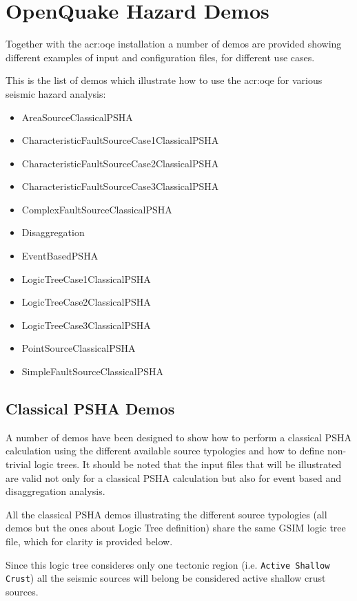 \section{OpenQuake Hazard Demos}
Together with the \gls{acr:oqe} installation a number of demos are provided 
showing different examples of input and configuration files, for different 
use cases.

This is the list of demos which illustrate how to use the \gls{acr:oqe} for 
various seismic hazard analysis:
\begin{itemize}
\item AreaSourceClassicalPSHA
\item CharacteristicFaultSourceCase1ClassicalPSHA
\item CharacteristicFaultSourceCase2ClassicalPSHA
\item CharacteristicFaultSourceCase3ClassicalPSHA
\item ComplexFaultSourceClassicalPSHA
\item Disaggregation
\item EventBasedPSHA
\item LogicTreeCase1ClassicalPSHA
\item LogicTreeCase2ClassicalPSHA
\item LogicTreeCase3ClassicalPSHA
\item PointSourceClassicalPSHA
\item SimpleFaultSourceClassicalPSHA
\end{itemize}

\subsection{Classical PSHA Demos}
A number of demos have been designed to show how to perform a classical PSHA 
calculation using the different available
source typologies and how to define non-trivial logic trees. It should be 
noted that the input files that will be illustrated are valid
not only for a classical PSHA calculation but also for event based and 
disaggregation analysis.

All the classical PSHA demos illustrating the different source typologies 
(all demos but the ones about Logic Tree definition)
share the same GSIM logic tree file, which for clarity is 
provided below.

Since this logic tree consideres only one tectonic region (i.e.
\texttt{Active Shallow Crust}) all the seismic sources will belong
be considered active shallow crust sources.

